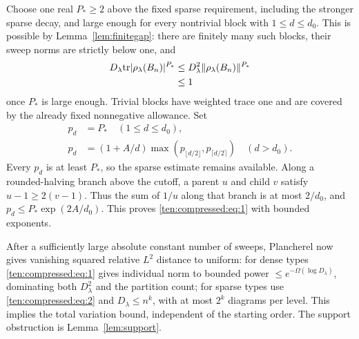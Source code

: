 Choose one real \(P_*\ge2\) above the fixed sparse requirement, including the stronger sparse decay, and large enough for every nontrivial block with \(1\le d\le d_0\). This is possible by Lemma~\ref{lem:finitegap}: there are finitely many such blocks, their sweep norms are strictly below one, and
\[
 \begin{aligned}
 D_\lambda {\rm tr}|\rho_\lambda(B_n)|^{P_*}
 &\le D_\lambda^2\|\rho_\lambda(B_n)\|^{P_*}\\
 &\le1
 \end{aligned}
\]
once \(P_*\) is large enough. Trivial blocks have weighted trace one and are covered by the already fixed nonnegative allowance. Set
\[
 \begin{aligned}
 p_d&=P_*\quad(1\le d\le d_0),\\
 p_d&=(1+A/d)\max(p_{\lfloor d/2\rfloor},p_{\lceil d/2\rceil})
       \quad(d>d_0).
 \end{aligned}
\]
Every \(p_d\) is at least \(P_*\), so the sparse estimate remains available. Along a rounded-halving branch above the cutoff, a parent \(u\) and child \(v\) satisfy \(u-1\ge2(v-1)\). Thus the sum of \(1/u\) along that branch is at most \(2/d_0\), and
\(p_d\le P_*\exp(2A/d_0)\). This proves \eqref{ten:compressed:eq:1} with bounded exponents.

After a sufficiently large absolute constant number of sweeps, Plancherel now gives vanishing squared relative \(L^2\) distance to uniform: for dense types \eqref{ten:compressed:eq:1} gives individual norm to bounded power \(\le e^{-\Omega(\log D_\lambda)}\), dominating both \(D_\lambda^2\) and the partition count; for sparse types use \eqref{ten:compressed:eq:2} and \(D_\lambda\le n^k\), with at most \(2^k\) diagrams per level. This implies the total variation bound, independent of the starting order. The support obstruction is Lemma~\ref{lem:support}.
